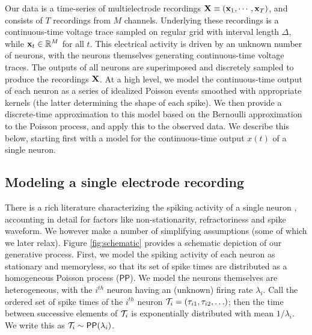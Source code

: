 Our data is a time-series of multielectrode recordings $\mathbf{X} \equiv (\mathbf{x}_1, \cdots, \mathbf{x}_T)$, and consists of $T$ recordings from $M$ channels. 
Underlying these recordings is a continuous-time voltage trace sampled on regular grid with interval length $\Delta$, while $\mathbf{x}_t \in \mathbb{R}^M$ for all $t$. 
This electrical activity is driven by an unknown number of neurons, %
with the neurons themselves generating continuous-time voltage traces. 
The outputs of all neurons are superimposed and discretely sampled to produce the 
recordings $\mathbf{X}$.  At a high level, we model the continuous-time output of each neuron as a
series of idealized Poisson events smoothed with appropriate kernels (the latter determining the shape of each spike).
We then provide a discrete-time approximation to this model based on the Bernoulli approximation to the Poisson process, and
apply this to the observed data.
% 
We describe this below, starting first with a model for the continuous-time output $x(t)$ of a single neuron.

\subsection{Modeling a single electrode recording}

There is a rich literature characterizing the spiking activity of a single neuron \citep{?}, accounting in detail for factors like non-stationarity, 
refractoriness and spike waveform. We however make a number of simplifying assumptions (some of which we later relax).
Figure \ref{fig:schematic}  provides a schematic depiction of our generative process.
First, we model the spiking activity of each neuron as stationary and memoryless, so that its set of spike times are 
distributed as a homogeneous Poisson process ($\mathsf{PP}$).  %
 We model the neurons themselves are heterogeneous, with the $i^{th}$ neuron having
an (unknown) firing rate $\lambda_i$. 
Call the ordered set of spike times of the $i^{th}$ neuron $\mathcal{T}_i=(\tau_{i1}, \tau_{i2},\ldots)$; then the time between successive elements of $\mathcal{T}_i$ is 
exponentially distributed with mean $1/\lambda_i$. We write this as
$ \mathcal{T}_i \sim \mathsf{PP}(\lambda_i)$.

